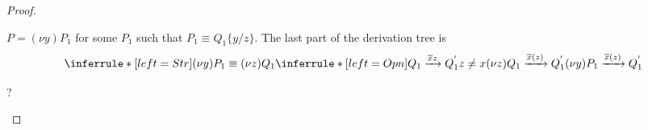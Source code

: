 \begin{theorem}
\begin{proof}
\begin{description}
\begin{description}
\begin{itemize}
\begin{description}
\begin{itemize}
			$P=(\nu y) P_{1}$ for some $P_{1}$ such that $P_{1}\equiv Q_{1}\{y/z\}$. The last part of the derivation tree is 
			\[
			  \inferrule* [left=Str]{
			      (\nu y) P_{1}\equiv (\nu z) Q_{1}
			    \\
			      \inferrule* [left=Opn]{
				  Q_{1} \xrightarrow{\overline{x}z} Q_{1}^{'}
				\\
				  z\neq x
			      }{
				(\nu z) Q_{1} \xrightarrow{\overline{x}(z)} Q_{1}^{'}
			      }
			  }{
			    (\nu y) P_{1} \xrightarrow{\overline{x}(z)} Q_{1}^{'}
			  }
			\]
\begin{center}
  ?
\end{center}

		  \end{itemize}
		\end{description}
	    \end{itemize}	    
	\end{description}

\end{description}
\end{proof}
\end{theorem}
